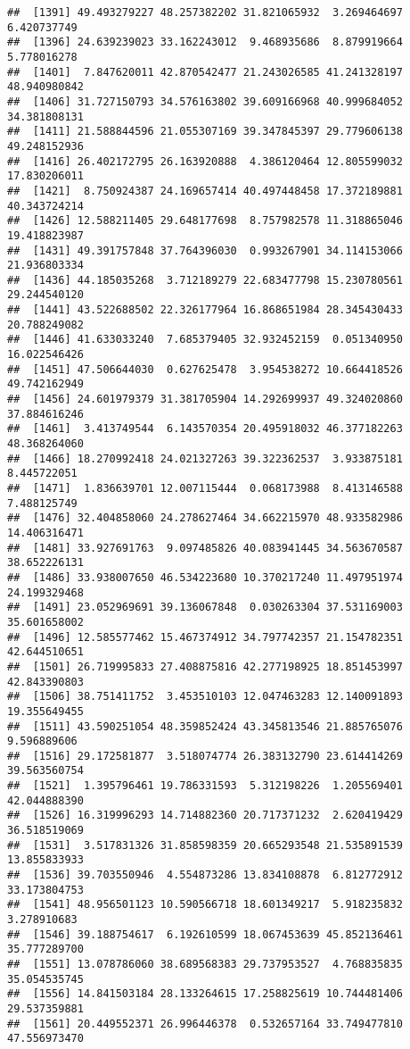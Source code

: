 \documentclass[
]{article}
\begin{document}
\begin{verbatim}
##  [1391] 49.493279227 48.257382202 31.821065932  3.269464697  6.420737749
##  [1396] 24.639239023 33.162243012  9.468935686  8.879919664  5.778016278
##  [1401]  7.847620011 42.870542477 21.243026585 41.241328197 48.940980842
##  [1406] 31.727150793 34.576163802 39.609166968 40.999684052 34.381808131
##  [1411] 21.588844596 21.055307169 39.347845397 29.779606138 49.248152936
##  [1416] 26.402172795 26.163920888  4.386120464 12.805599032 17.830206011
##  [1421]  8.750924387 24.169657414 40.497448458 17.372189881 40.343724214
##  [1426] 12.588211405 29.648177698  8.757982578 11.318865046 19.418823987
##  [1431] 49.391757848 37.764396030  0.993267901 34.114153066 21.936803334
##  [1436] 44.185035268  3.712189279 22.683477798 15.230780561 29.244540120
##  [1441] 43.522688502 22.326177964 16.868651984 28.345430433 20.788249082
##  [1446] 41.633033240  7.685379405 32.932452159  0.051340950 16.022546426
##  [1451] 47.506644030  0.627625478  3.954538272 10.664418526 49.742162949
##  [1456] 24.601979379 31.381705904 14.292699937 49.324020860 37.884616246
##  [1461]  3.413749544  6.143570354 20.495918032 46.377182263 48.368264060
##  [1466] 18.270992418 24.021327263 39.322362537  3.933875181  8.445722051
##  [1471]  1.836639701 12.007115444  0.068173988  8.413146588  7.488125749
##  [1476] 32.404858060 24.278627464 34.662215970 48.933582986 14.406316471
##  [1481] 33.927691763  9.097485826 40.083941445 34.563670587 38.652226131
##  [1486] 33.938007650 46.534223680 10.370217240 11.497951974 24.199329468
##  [1491] 23.052969691 39.136067848  0.030263304 37.531169003 35.601658002
##  [1496] 12.585577462 15.467374912 34.797742357 21.154782351 42.644510651
##  [1501] 26.719995833 27.408875816 42.277198925 18.851453997 42.843390803
##  [1506] 38.751411752  3.453510103 12.047463283 12.140091893 19.355649455
##  [1511] 43.590251054 48.359852424 43.345813546 21.885765076  9.596889606
##  [1516] 29.172581877  3.518074774 26.383132790 23.614414269 39.563560754
##  [1521]  1.395796461 19.786331593  5.312198226  1.205569401 42.044888390
##  [1526] 16.319996293 14.714882360 20.717371232  2.620419429 36.518519069
##  [1531]  3.517831326 31.858598359 20.665293548 21.535891539 13.855833933
##  [1536] 39.703550946  4.554873286 13.834108878  6.812772912 33.173804753
##  [1541] 48.956501123 10.590566718 18.601349217  5.918235832  3.278910683
##  [1546] 39.188754617  6.192610599 18.067453639 45.852136461 35.777289700
##  [1551] 13.078786060 38.689568383 29.737953527  4.768835835 35.054535745
##  [1556] 14.841503184 28.133264615 17.258825619 10.744481406 29.537359881
##  [1561] 20.449552371 26.996446378  0.532657164 33.749477810 47.556973470

\end{verbatim}
\end{document}
